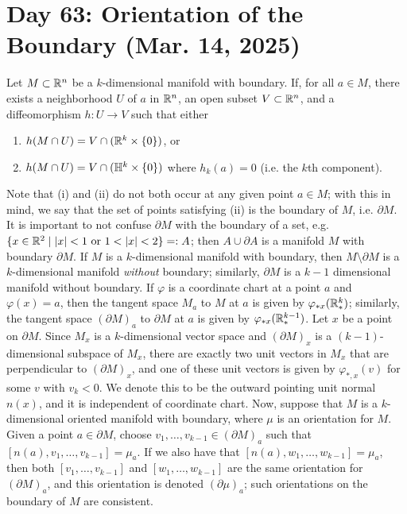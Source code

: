 \section{Day 63: Orientation of the Boundary (Mar. 14, 2025)}
Let $M \subset \mathbb R^n$ be a $k$-dimensional manifold with boundary. If, for all $a \in M$, there exists a neighborhood $U$ of $a$ in $\mathbb R^n$, an open subset $V \subset \mathbb R^n$, and a diffeomorphism $h : U \to V$ such that either
\begin{enumerate}[label=(\roman*)]
    \item $h(M \cap U) = V \cap (\mathbb R^k \times \{0\})$, or
    \item $h(M \cap U) = V \cap (\mathbb H^k \times \{0\})$ where $h_k(a) = 0$ (i.e. the $k$th component).
\end{enumerate}
Note that (i) and (ii) do not both occur at any given point $a \in M$; with this in mind, we say that the set of points satisfying (ii) is the boundary of $M$, i.e. $\partial M$. It is important to not confuse $\partial M$ with the boundary of a set, e.g. $\{x \in \mathbb R^2 \mid \left\lvert x \right\rvert < 1 \text{ or } 1 < \left\lvert x \right\rvert < 2 \} =: A$; then $A \cup \partial A$ is a manifold $M$ with boundary $\partial M$.
\medskip\newline
If $M$ is a $k$-dimensional manifold with boundary, then $M \setminus \partial M$ is a $k$-dimensional manifold \textit{without} boundary; similarly, $\partial M$ is a $k-1$ dimensional manifold without boundary. If $\varphi$ is a coordinate chart at a point $a$ and $\varphi(x) = a$, then the tangent space $M_a$ to $M$ at $a$ is given by $\varphi_{\ast x}(\mathbb R_\ast^k)$; similarly, the tangent space $(\partial M)_a$ to $\partial M$ at $a$ is given by $\varphi_{\ast x}(\mathbb R_\ast^{k-1})$.
\medskip\newline
Let $x$ be a point on $\partial M$. Since $M_x$ is a $k$-dimensional vector space and $(\partial M)_x$ is a $(k-1)$-dimensional subspace of $M_x$, there are exactly two unit vectors in $M_x$ that are perpendicular to $(\partial M)_x$, and one of these unit vectors is given by $\varphi_{\ast, x}(v)$ for some $v$ with $v_k < 0$. We denote this to be the outward pointing unit normal $n(x)$, and it is independent of coordinate chart.
\medskip\newline
Now, suppose that $M$ is a $k$-dimensional oriented manifold with boundary, where $\mu$ is an orientation for $M$. Given a point $a \in \partial M$, choose $v_1, \dots, v_{k-1} \in (\partial M)_a$ such that $[n(a), v_1, \dots, v_{k-1}] = \mu_a$. If we also have that $[n(a), w_1, \dots, w_{k-1}] = \mu_a$, then both $[v_1, \dots, v_{k-1}]$ and $[w_1, \dots, w_{k-1}]$ are the same orientation for $(\partial M)_a$, and this orientation is denoted $(\partial \mu)_a$; such orientations on the boundary of $M$ are consistent.
